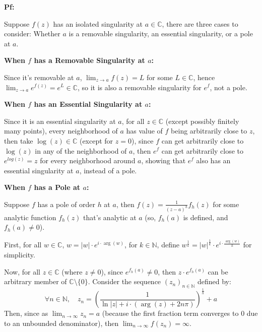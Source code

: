 \documentclass{article}
\begin{document}
\textbf{Pf:}

Suppose $f(z)$ has an isolated singularity at $a\in\mathbb{C}$, there are three cases to consider:
Whether $a$ is a removable singularity, an essential singularity, or a pole at $a$.

\hfill

\textbf{When $f$ has a Removable Singularity at $a$:}

Since it's removable at $a$, $\lim_{z\rightarrow a}f(z) = L$ for some $L\in\mathbb{C}$, hence $\lim_{z\rightarrow a}e^{f(z)}=e^L\in\mathbb{C}$,
so it is also a removable singularity for $e^f$, not a pole.

\hfill

\textbf{When $f$ has an Essential Singularity at $a$:}

Since it is an essential singularity at $a$, for all $z\in\mathbb{C}$ (except possibly finitely many points), every neighborhood of $a$ has value of $f$
being arbitrarily close to $z$, then take $\log(z)\in\mathbb{C}$ (except for $z=0$), since $f$ can get arbitrarily close to $\log(z)$ in any of the neighborhood of $a$,
then $e^f$ can get arbitrarily close to $e^{log(z)} = z$ for every neighborhood around $a$, showing that $e^f$ also has an essential singularity at $a$, instead of a pole.

\hfill

\textbf{When $f$ has a Pole at $a$:}

Suppose $f$ has a pole of order $h$ at $a$, then $f(z)=\frac{1}{(z-a)^h}f_h(z)$ for some analytic function $f_h(z)$ that's analytic at $a$ (so, $f_h(a)$ is defined, and $f_h(a)\neq 0$).

First, for all $w\in\mathbb{C}$, $w=|w|\cdot e^{i\cdot \arg(w)}$, for $k\in\mathbb{N}$, define $w^\frac{1}{k} = |w|^\frac{1}{k}\cdot e^{i\cdot\frac{\arg(w)}{k}}$ for simplicity.

Now, for all $z\in\mathbb{C}$ (where $z\neq 0$), since $e^{f_h(a)}\neq 0$, then $z\cdot e^{f_h(a)}$ can be arbitrary member of $\mathbb{C}\setminus\{0\}$. Consider the sequence $(z_n)_{n\in\mathbb{N}}$ defined by:
$$\forall n\in\mathbb{N},\quad z_n=\left(\frac{1}{\ln|z|+i\cdot(\arg(z)+2n\pi)}\right)^\frac{1}{h}+a$$
Then, since as $\lim_{n\rightarrow\infty}z_n=a$ (because the first fraction term converges to $0$ due to an unbounded denominator), then $\lim_{n\rightarrow\infty}f(z_n)=\infty$.
\end{document}

